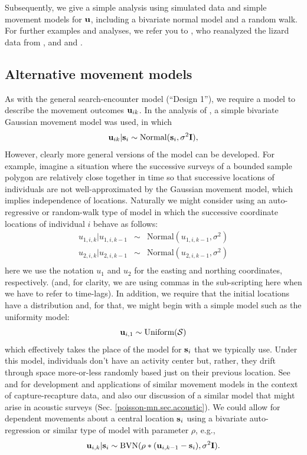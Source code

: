 Subsequently, we give a simple analysis using simulated data and 
simple movement models for ${\bf u}$, including a bivariate normal
model and a random walk. 
For further examples and analyses, we refer you to
\citet{royle_dorazio:2008}, who reanalyzed the lizard data from
\citet{royle_young:2008}, and \citet{efford:2011ecol} and
\citet{marques_etal:2011}.



\subsection{Alternative movement models}
\label{searchencounter.sec.movement}

As with the general search-encounter model (``Design 1''), we require
a model to describe the movement outcomes ${\bf u}_{ik}$.
In the analysis of \citet{royle_young:2008}, a simple bivariate
Gaussian movement model was used, in which
\[
 {\bf u}_{ik} | {\bf s}_{i} \sim \mbox{Normal}({\bf s}_{i}, \sigma^{2}{\bf I}),
\]
However, clearly more general versions of the model can be developed.
For example, imagine a situation where the successive surveys of a
bounded sample polygon are relatively close together in time so that
successive locations of individuals are not well-approximated by the
Gaussian movement model, which implies independence of
locations. Naturally we might consider using an auto-regressive or
random-walk type of model in which the successive coordinate locations
of individual $i$ behave as follows:
\begin{eqnarray*}
 u_{1,i,k} | u_{1,i,k-1} &\sim &  \mbox{Normal}( u_{1,i,k-1},  \sigma^{2}) \\
 u_{2,i,k} | u_{2,i,k-1} &\sim &  \mbox{Normal}( u_{2,i,k-1},  \sigma^{2}) \\
\end{eqnarray*}
here we use the notation $u_{1}$ and $u_{2}$ for the easting and
northing coordinates, respectively. (and, for clarity, we are using
commas in the sub-scripting here when we have to refer to time-lags).
 In addition, we require that the initial locations have a
distribution and, for that, we might begin with a simple model such as
the uniformity model:
\[
 {\bf u}_{i,1} \sim \mbox{Uniform}({\cal S})
\]
which effectively takes the place of the model for ${\bf s}_{i}$ that
we typically use. Under this model, individuals don't have an activity
center but, rather, they drift through space more-or-less randomly
based just on their previous location. See \citet{ovaskainen:2004} and
\citet{ovaskainen_etal:2008} for development and applications of similar
movement models in the context of capture-recapture data,
and also our discussion of a similar model that might arise in
acoustic surveys (Sec. \ref{poisson-mn.sec.acoustic}).  We could allow
for dependent movements about a central location ${\bf s}_{i}$ using a
bivariate auto-regression or similar type of model with parameter
$\rho$, e.g.,
\[
 {\bf u}_{i,k} | {\bf s}_{i} \sim   \mbox{BVN}( \rho*( {\bf u}_{i,k-1} - {\bf s}_{i} ),  \sigma^{2} {\bf I}).
\]

